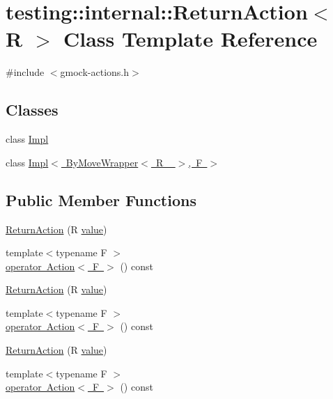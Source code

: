 \hypertarget{classtesting_1_1internal_1_1_return_action}{}\section{testing\+::internal\+::Return\+Action$<$ R $>$ Class Template Reference}
\label{classtesting_1_1internal_1_1_return_action}


{\ttfamily \#include $<$gmock-\/actions.\+h$>$}

\subsection*{Classes}
\begin{DoxyCompactItemize}
\item 
class \mbox{\hyperlink{classtesting_1_1internal_1_1_return_action_1_1_impl}{Impl}}
\item 
class \mbox{\hyperlink{classtesting_1_1internal_1_1_return_action_1_1_impl_3_01_by_move_wrapper_3_01_r___01_4_00_01_f_01_4}{Impl$<$ By\+Move\+Wrapper$<$ R\+\_\+ $>$, F $>$}}
\end{DoxyCompactItemize}
\subsection*{Public Member Functions}
\begin{DoxyCompactItemize}
\item 
\mbox{\hyperlink{classtesting_1_1internal_1_1_return_action_af65344e503dae3ab36b4fd6d1ede6fb7}{Return\+Action}} (R \mbox{\hyperlink{_obj__test_2lib_2googletest-master_2googlemock_2test_2gmock-matchers__test_8cc_a337b8a670efc0b086ad3af163f3121b6}{value}})
\item 
{\footnotesize template$<$typename F $>$ }\\\mbox{\hyperlink{classtesting_1_1internal_1_1_return_action_a1aab69c4ea104e76e70ba209763f61d5}{operator Action$<$ F $>$}} () const
\item 
\mbox{\hyperlink{classtesting_1_1internal_1_1_return_action_af65344e503dae3ab36b4fd6d1ede6fb7}{Return\+Action}} (R \mbox{\hyperlink{_obj__test_2lib_2googletest-master_2googlemock_2test_2gmock-matchers__test_8cc_a337b8a670efc0b086ad3af163f3121b6}{value}})
\item 
{\footnotesize template$<$typename F $>$ }\\\mbox{\hyperlink{classtesting_1_1internal_1_1_return_action_a1aab69c4ea104e76e70ba209763f61d5}{operator Action$<$ F $>$}} () const
\item 
\mbox{\hyperlink{classtesting_1_1internal_1_1_return_action_af65344e503dae3ab36b4fd6d1ede6fb7}{Return\+Action}} (R \mbox{\hyperlink{_obj__test_2lib_2googletest-master_2googlemock_2test_2gmock-matchers__test_8cc_a337b8a670efc0b086ad3af163f3121b6}{value}})
\item 
{\footnotesize template$<$typename F $>$ }\\\mbox{\hyperlink{classtesting_1_1internal_1_1_return_action_a1aab69c4ea104e76e70ba209763f61d5}{operator Action$<$ F $>$}} () const
\end{DoxyCompactItemize}

